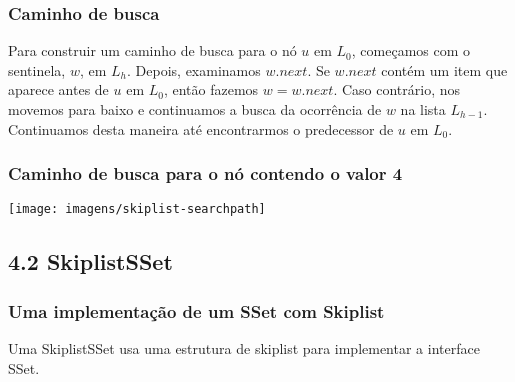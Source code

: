 \documentclass{beamer}
\begin{document}
\begin{frame}
\frametitle{Caminho de busca}
Para construir um caminho de busca para o nó $ \ensuremath{\ensuremath{\mathit{u}}}$ em $ L_0$, começamos com o sentinela, $w$, em $L_h$. Depois, examinamos $ \ensuremath{\ensuremath{\mathit{w}}.\ensuremath{\mathit{next}}}$. Se $ \ensuremath{\ensuremath{\mathit{w}}.\ensuremath{\mathit{next}}}$ contém um item que aparece antes de $ \ensuremath{\ensuremath{\mathit{u}}}$ em $ L_0$, então fazemos $ \ensuremath{\ensuremath{\ensuremath{\mathit{w}}}}=\ensuremath{\ensuremath{\ensuremath{\mathit{w}}.\ensuremath{\mathit{next}}}}$. Caso contrário, nos movemos para baixo e continuamos a busca da ocorrência de  $ \ensuremath{\ensuremath{\mathit{w}}}$ na lista $ L_{h-1}$. Continuamos desta maneira até encontrarmos o predecessor de $ \ensuremath{\ensuremath{\mathit{u}}}$ em $ L_0$.  
\end{frame}

\begin{frame}
\frametitle{Caminho de busca para o nó contendo o valor 4}

\texttt{[image: imagens/skiplist-searchpath]}

\end{frame}

\subsection{4.2 SkiplistSSet}
\begin{frame}
\frametitle{Uma implementação de um SSet com Skiplist}

Uma SkiplistSSet usa uma estrutura de skiplist para implementar a interface SSet.
\end{frame}
\end{document}
